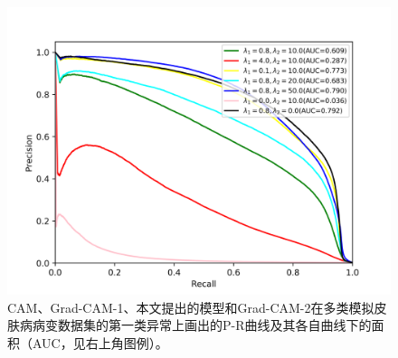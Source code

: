 \begin{figure}[!htbp]
	\centering
	\includegraphics[width=1.0\textwidth]{figure/pr_curve_multi_skin_hyper_paras/CIRCLE_pr_curve.png}
	\caption{CAM、Grad-CAM-1、本文提出的模型和Grad-CAM-2在多类模拟皮肤病病变数据集的第一类异常上画出的P-R曲线及其各自曲线下的面积（AUC，见右上角图例）。} 
	\label{fig:multi_simulate_pr_curve_circle_hyper_paras}
\end{figure}


\begin{table}[h]
	\centering
	\caption{不同超参数组合下，本文提出的模型在二类视网膜糖尿病病变数据集上计算得到的AUC分数列表。}		
	\label{tab:simulated_skin_diff_parameters}
\end{table}

